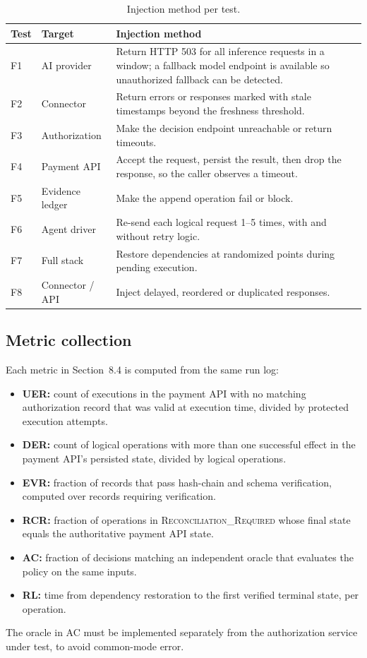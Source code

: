 \documentclass[11pt,a4paper]{article}
\begin{document}
\begin{table}[ht]
\centering
\caption{Injection method per test.}
\label{tab:inject}
\begin{tabular}{@{}llp{7.6cm}@{}}
\toprule
\textbf{Test} & \textbf{Target} & \textbf{Injection method} \\
\midrule
F1 & AI provider & Return HTTP 503 for all inference requests in a window; a fallback model endpoint is available so unauthorized fallback can be detected. \\
F2 & Connector & Return errors or responses marked with stale timestamps beyond the freshness threshold. \\
F3 & Authorization & Make the decision endpoint unreachable or return timeouts. \\
F4 & Payment API & Accept the request, persist the result, then drop the response, so the caller observes a timeout. \\
F5 & Evidence ledger & Make the append operation fail or block. \\
F6 & Agent driver & Re-send each logical request 1--5 times, with and without retry logic. \\
F7 & Full stack & Restore dependencies at randomized points during pending execution. \\
F8 & Connector / API & Inject delayed, reordered or duplicated responses. \\
\bottomrule
\end{tabular}
\end{table}

\subsection{Metric collection}

Each metric in Section~8.4 is computed from the same run log:
\begin{itemize}
  \item \textbf{UER:} count of executions in the payment API with no matching authorization record that was valid at execution time, divided by protected execution attempts.
  \item \textbf{DER:} count of logical operations with more than one successful effect in the payment API's persisted state, divided by logical operations.
  \item \textbf{EVR:} fraction of records that pass hash-chain and schema verification, computed over records requiring verification.
  \item \textbf{RCR:} fraction of operations in \textsc{Reconciliation\_Required} whose final state equals the authoritative payment API state.
  \item \textbf{AC:} fraction of decisions matching an independent oracle that evaluates the policy on the same inputs.
  \item \textbf{RL:} time from dependency restoration to the first verified terminal state, per operation.
\end{itemize}
The oracle in AC must be implemented separately from the authorization service under test, to avoid common-mode error.
\end{document}
